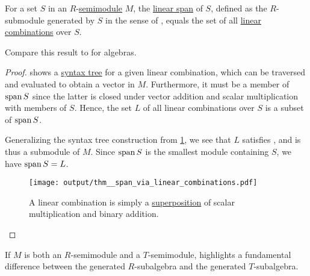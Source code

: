 \begin{proposition}\label{thm:span_via_linear_combinations}
  For a set \( S \) in an \( R \)-\hyperref[def:semimodule]{semimodule} \( M \), the \hyperref[def:semimodule/submodel]{linear span} of \( S \), defined as the \( R \)-submodule generated by \( S \) in the sense of , equals the set of all \hyperref[def:linear_combination]{linear combinations} over \( S \).

  Compare this result to  for algebras.
\end{proposition}
\begin{proof}
   shows a \hyperref[def:concrete_syntax_tree]{syntax tree} for a given linear combination, which can be traversed and evaluated to obtain a vector in \( M \). Furthermore, it must be a member of \( \operatorname{span} S \) since the latter is closed under vector addition and scalar multiplication with members of \( S \). Hence, the set \( L \) of all linear combinations over \( S \) is a subset of \( \operatorname{span} S \).

  Generalizing the syntax tree construction from \cref{fig:thm:span_via_linear_combinations}, we see that \( L \) satisfies , and is thus a submodule of \( M \). Since \( \operatorname{span} S \) is the smallest module containing \( S \), we have \( \operatorname{span} S = L \).

  \begin{figure}[h]
    \hfill
    \texttt{[image: output/thm\_\_span\_via\_linear\_combinations.pdf]}
    \hfill\hfill
    \caption{A linear combination is simply a \hyperref[def:multi_valued_function/superposition]{superposition} of scalar multiplication and binary addition.}
    \label{fig:thm:span_via_linear_combinations}
  \end{figure}
\end{proof}

\begin{remark}\label{rem:span_over_different_semirings}
  If \( M \) is both an \( R \)-semimodule and a \( T \)-semimodule,  highlights a fundamental difference between the generated \( R \)-subalgebra and the generated \( T \)-subalgebra.
\end{remark}

